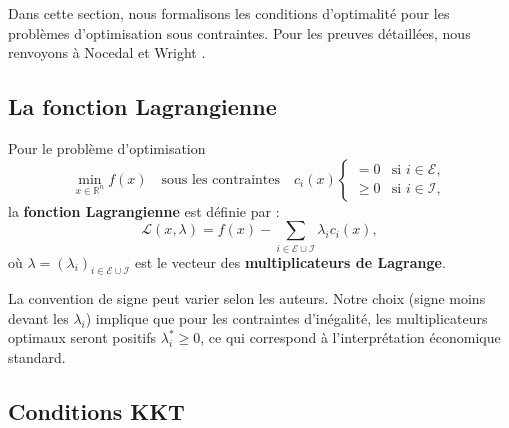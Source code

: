 Dans cette section, nous formalisons les conditions d'optimalité pour les problèmes d'optimisation sous contraintes. Pour les preuves détaillées, nous renvoyons à Nocedal et Wright \cite{nocedal2006numerical}.

\subsection{La fonction Lagrangienne}

\begin{definition}
    Pour le problème d'optimisation
    \begin{equation}
        \min_{x \in \mathbb{R}^n} f(x) \quad \text{sous les contraintes} \quad c_i(x) \begin{cases} = 0 & \text{si } i \in \mathcal{E}, \\ \geq 0 & \text{si } i \in \mathcal{I}, \end{cases}
    \end{equation}
    la \textbf{fonction Lagrangienne} est définie par :
    \begin{equation}
        \mathcal{L}(x, \lambda) = f(x) - \sum_{i \in \mathcal{E} \cup \mathcal{I}} \lambda_i c_i(x),
    \end{equation}
    où $\lambda = (\lambda_i)_{i \in \mathcal{E} \cup \mathcal{I}}$ est le vecteur des \textbf{multiplicateurs de Lagrange}.
\end{definition}

\begin{remarque}
    La convention de signe peut varier selon les auteurs. Notre choix (signe moins devant les $\lambda_i$) implique que pour les contraintes d'inégalité, les multiplicateurs optimaux seront positifs $\lambda_i^* \geq 0$, ce qui correspond à l'interprétation économique standard.
\end{remarque}

\subsection{Conditions KKT}


